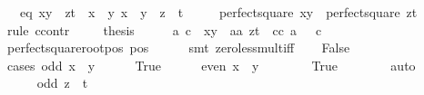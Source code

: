 \begin{isabellebody}
\ \ \ eq{\isacharcolon}\ {\isachardoublequoteopen}x{\isacharasterisk}y\ {\isacharminus}\ z{\isacharasterisk}t\ {\isacharequal}\ x\ {\isacharplus}\ y{\isachardoublequoteclose}\ {\isachardoublequoteopen}x\ {\isacharplus}\ y\ {\isacharequal}\ z\ {\isacharplus}\ t{\isachardoublequoteclose}\isanewline
\ \ \ {\isachardoublequoteopen}\ {\isasymnot}\ {\isacharparenleft}perfect{\isacharunderscore}square\ {\isacharparenleft}x{\isacharasterisk}y{\isacharparenright}\ {\isasymand}\ perfect{\isacharunderscore}square\ {\isacharparenleft}z{\isacharasterisk}t{\isacharparenright}{\isacharparenright}{\isachardoublequoteclose}\isanewline
%
\isadelimproof
%
\endisadelimproof
%
\isatagproof
{}\isamarkupfalse%
\ {\isacharparenleft}rule\ ccontr{\isacharparenright}\isanewline
\ \ \isamarkupfalse%
\ {\isachardoublequoteopen}{\isasymnot}\ {\isacharquery}thesis{\isachardoublequoteclose}\isanewline
\ \ \isamarkupfalse%
\ \isamarkupfalse%
\ a\ c\ \ {\isachardoublequoteopen}x{\isacharasterisk}y\ {\isacharequal}\ a{\isacharasterisk}a{\isachardoublequoteclose}\ {\isachardoublequoteopen}z{\isacharasterisk}t\ {\isacharequal}\ c{\isacharasterisk}c{\isachardoublequoteclose}\ {\isachardoublequoteopen}a\ {\isachargreater}\ {}{\isachardoublequoteclose}\ {\isachardoublequoteopen}c\ {\isachargreater}\ {}{\isachardoublequoteclose}\isanewline
\ \ \ \ \isamarkupfalse%
\ perfect{\isacharunderscore}square{\isacharunderscore}root{\isacharunderscore}pos\ pos\isanewline
\ \ \ \ \isamarkupfalse%
\ {\isacharparenleft}smt\ zero{\isacharunderscore}less{\isacharunderscore}mult{\isacharunderscore}iff{\isacharparenright}\isanewline
\isanewline
\ \ \isamarkupfalse%
\ False\isanewline
\ \ \isamarkupfalse%
\ {\isacharparenleft}cases\ {\isachardoublequoteopen}odd\ {\isacharparenleft}x\ {\isacharplus}\ y{\isacharparenright}{\isachardoublequoteclose}{\isacharparenright}\isanewline
\ \ \ \ \isamarkupfalse%
\ True\isanewline
\isanewline
\ \ \ \ \isamarkupfalse%
\ {\isachardoublequoteopen}even\ {\isacharparenleft}x\ {\isacharasterisk}\ y{\isacharparenright}{\isachardoublequoteclose}\isanewline
\ \ \ \ \ \ \isamarkupfalse%
\ True\isanewline
\ \ \ \ \ \ \isamarkupfalse%
\ auto\isanewline
\isanewline
\ \ \ \ \isamarkupfalse%
\isanewline
\isanewline
\ \ \ \ \isamarkupfalse%
\ {\isachardoublequoteopen}odd\ {\isacharparenleft}z\ {\isacharplus}\ t{\isacharparenright}{\isachardoublequoteclose}\isanewline

\end{isabellebody}
